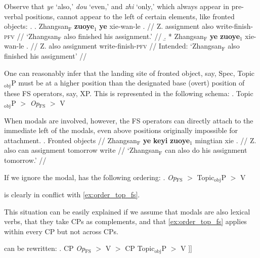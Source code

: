 \documentclass[11pt]{article}
\let\latextextsubscript\textsubscript
\let\textsubscript\latextextsubscript
\newcommand{\gap}[1]{\rule{1em}{0.4pt}\textsubscript{#1}}
\newcommand{\F}{\ensuremath{_{\mathrm{F}}}}
\newcommand{\opfs}{\textit{Op}\(_{\mathrm{FS}}\)}
\newcommand{\topobj}{Topic\(_{\mathrm{obj}}\)P}
\begin{document}
Observe that \emph{ye} `also,' \emph{dou} `even,' and \emph{zhi} `only,' which always appear in pre-verbal positions, cannot appear to the left of certain elements, like fronted objects:
%
\ex.
\a. \begingl
\gla Zhangsan\F{} \textbf{zuoye}\(_1\) \textbf{ye} xie-wan-le \nogloss{\gap{1}}. //
  \glb Z. assignment also write-finish-\textsc{pfv} //
  \glft `Zhangsan\F{} also finished his assignment.' //
\endgl
\b. * \begingl
\gla Zhangsan\F{} \textbf{ye} \textbf{zuoye}\(_1\) xie-wan-le \nogloss{\gap{1}}. //
  \glb Z. also assignment write-finish-\textsc{pfv} //
  \glft Intended: `Zhangsan\F{} also finished his assignment' //
\endgl



One can reasonably infer that the landing site of fronted object, say, Spec, \topobj{} must be at a higher position than the designated base (overt) position of these FS operators, say, XP.
This is represented in the following schema:
\ex. \label{ex:order_top_fs} \topobj{} \(>\) \opfs{} \(>\) V

When modals are involved, however, the FS operators can directly attach to the immediate left of the modals, even above positions originally impossible for attachment.
%
\ex.
\begingl
\glpreamble Fronted objects //
\gla Zhangsan\F{} \textbf{ye} \textbf{keyi} \textbf{zuoye}\(_1\) mingtian xie \nogloss{\gap{1}}. //
  \glb Z. also can assignment tomorrow write //
  \glft `Zhangsan\F{} can also do his assignment tomorrow.' //
\endgl

If we ignore the modal, \Last has the following ordering:
\ex. \opfs{} \(>\) \topobj{} \(>\) V  \label{ex:paradox}

\Last is clearly in conflict with \cref{ex:order_top_fs}.

This situation can be easily explained if we assume that modals are also lexical verbs, that they take CPs as complements, and that \cref{ex:order_top_fs} applies within every CP but not across CPs.

\Last can be rewritten:
\ex. \I{[}CP \opfs{} \(>\) V \(>\) \I{[}CP \topobj{} \(>\) V  ]]
\end{document}
